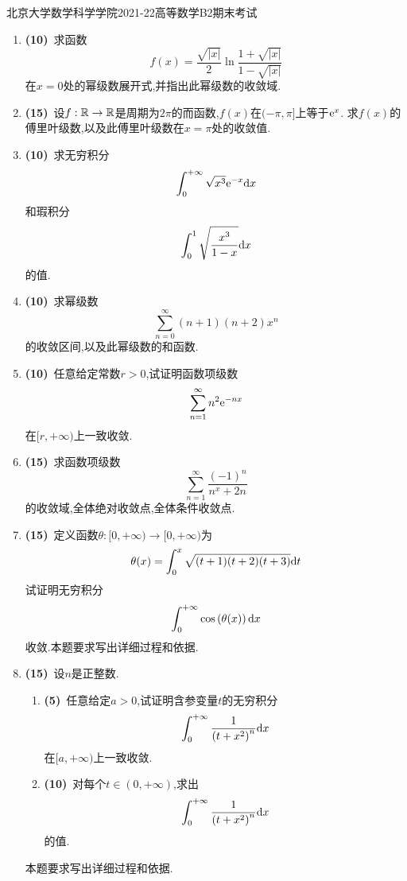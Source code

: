 \documentclass{ctexart}
\begin{document}
\pagestyle{empty}
\begin{center}\Large
    北京大学数学科学学院2021-22高等数学B2期末考试
\end{center}
\begin{enumerate}[leftmargin=*,label=\textbf{\arabic*.},topsep=0pt,parsep=0pt,itemsep=0pt,partopsep=0pt]
    \item \textbf{(10)}\ 求函数
        \[f(x)=\dfrac{\sqrt{|x|}}{2}\ln\dfrac{1+\sqrt{|x|}}{1-\sqrt{|x|}}\]
        在$x=0$处的幂级数展开式,并指出此幂级数的收敛域.

    \item \textbf{(15)}\ 设$f:\mathbb{R}\to\mathbb{R}$是周期为$2\pi$的而函数,$f(x)$在$(-\pi,\pi]$上等于$\mathrm{e}^x$.%
        求$f(x)$的傅里叶级数,以及此傅里叶级数在$x=\pi$处的收敛值.

    \item \textbf{(10)}\ 求无穷积分
        \[\int_0^{+\infty}\sqrt{x^3}\mathrm{e}^{-x}\mathrm{d} x\]
        和瑕积分
        \[\int_0^1\sqrt{\dfrac{x^3}{1-x}}\mathrm{d} x\]
        的值.

    \item \textbf{(10)}\ 求幂级数
        \[\sum_{n=0}^{\infty}(n+1)(n+2)x^n\]
        的收敛区间,以及此幂级数的和函数.
        
    \item \textbf{(10)}\ 任意给定常数$r>0$,试证明函数项级数
        \[\sum_{n=1}^\infty n^2\mathrm{e}^{-nx}\]
        在$[r,+\infty)$上一致收敛.

    \item \textbf{(15)}\ 求函数项级数
        \[\sum_{n=1}^\infty\dfrac{(-1)^n}{n^x+2n}\]
        的收敛域,全体绝对收敛点,全体条件收敛点.

    \item \textbf{(15)}\ 定义函数$\theta:[0,+\infty)\to[0,+\infty)$为
        \[\theta(x)=\int_0^x\sqrt{(t+1)(t+2)(t+3)}\mathrm{d} t\]
        试证明无穷积分
        \[\int_0^{+\infty}\cos\left(\theta(x)\right)\mathrm{d} x\]
        收敛.本题要求写出详细过程和依据.

    \item \textbf{(15)}\ 设$n$是正整数.
        \begin{enumerate}[label=\tbf{(\arabic*)},topsep=0pt,parsep=0pt,itemsep=0pt,partopsep=0pt]
            \item \textbf{(5)}\ 任意给定$a>0$,试证明含参变量$t$的无穷积分
                \[\int_0^{+\infty}\dfrac{1}{\left(t+x^2\right)^n}\mathrm{d} x\]
                在$[a,+\infty)$上一致收敛.
            \item \textbf{(10)}\ 对每个$t\in(0,+\infty)$,求出
                \[\int_0^{+\infty}\dfrac{1}{\left(t+x^2\right)^n}\mathrm{d} x\]
                的值.
        \end{enumerate}
        本题要求写出详细过程和依据.
\end{enumerate}
\end{document}
